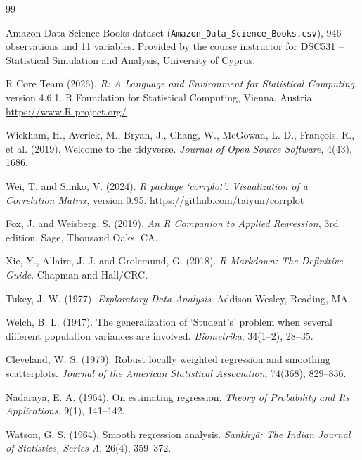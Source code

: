 \documentclass[11pt,a4paper]{article}
\begin{document}
\newpage
\begin{thebibliography}{99}
Amazon Data Science Books dataset (\texttt{Amazon\_Data\_Science\_Books.csv}), 946 observations and 11 variables. Provided by the course instructor for DSC531 -- Statistical Simulation and Analysis, University of Cyprus.

R Core Team (2026). \textit{R: A Language and Environment for Statistical Computing}, version 4.6.1. R Foundation for Statistical Computing, Vienna, Austria. \url{https://www.R-project.org/}

Wickham, H., Averick, M., Bryan, J., Chang, W., McGowan, L. D., Fran\c{c}ois, R., et al. (2019). Welcome to the tidyverse. \textit{Journal of Open Source Software}, 4(43), 1686.

Wei, T. and Simko, V. (2024). \textit{R package `corrplot': Visualization of a Correlation Matrix}, version 0.95. \url{https://github.com/taiyun/corrplot}

Fox, J. and Weisberg, S. (2019). \textit{An R Companion to Applied Regression}, 3rd edition. Sage, Thousand Oaks, CA.

Xie, Y., Allaire, J. J. and Grolemund, G. (2018). \textit{R Markdown: The Definitive Guide}. Chapman and Hall/CRC.

Tukey, J. W. (1977). \textit{Exploratory Data Analysis}. Addison-Wesley, Reading, MA.

Welch, B. L. (1947). The generalization of `Student's' problem when several different population variances are involved. \textit{Biometrika}, 34(1--2), 28--35.

Cleveland, W. S. (1979). Robust locally weighted regression and smoothing scatterplots. \textit{Journal of the American Statistical Association}, 74(368), 829--836.

Nadaraya, E. A. (1964). On estimating regression. \textit{Theory of Probability and Its Applications}, 9(1), 141--142.

Watson, G. S. (1964). Smooth regression analysis. \textit{Sankhy\=a: The Indian Journal of Statistics, Series A}, 26(4), 359--372.

\end{thebibliography}
\end{document}
